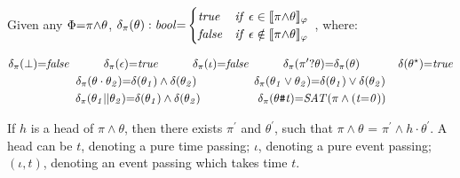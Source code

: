 \documentclass[acmsmall,10pt,review]{acmart}
\newcommand{\es}{\theta}
\newcommand{\ev}{\iota}
\newcommand{\effect}{\textcolor{black}{\ensuremath{\mathrm{\Phi}}}}
\newcommand{\seq}{\cdot}
\newcommand{\choice}{\vee}
\newcommand{\code}[1]{{\tt{\ensuremath{\m{#1}}}}}
\newcommand{\empt}{\textcolor{black}{\ensuremath{\epsilon}}}
\newcommand{\bott}{\textcolor{black}{\ensuremath{\bot}}}
\newcommand{\m}{\mathit}
\newcommand{\mysharp}{{\mathrel{\texttt{\#}}}}
\begin{document}
{\begin{definition}[Nullable]\label{Nullable}
Given any \code{\effect {=} \pi {\wedge} \es}, %
{
  \code{\delta_{{\pi}}(\es) :bool {=}
  \begin{cases}
        \code{true} & \code{if\ \empt \in \llbracket {\pi} {\wedge} \es \rrbracket_{\varphi}}\\
        \code{false} & \code{if\ \empt \notin \llbracket {\pi} {\wedge} \es \rrbracket_{\varphi}}
      \end{cases} }
      }, where:  

{ 
\begin{gather*}
\code{\delta_{\pi}(\bott) {=} false} 
\qquad\quad
\code{\delta_{\pi}(\empt) {=} true} 
\qquad\quad
\code{\delta_{\pi}(\ev){=} false}   
\qquad\quad
\code{\delta_{\pi}(\pi^\prime? \es){=} \delta_{\pi}(\es)}   
\qquad\quad\
    \code{\delta({\es^\star} ) {=} true}   
\\ 
\code{\delta_{\pi}(\es \seq \es_2) {=} \delta(\es_1) \wedge \delta(\es_2)}
\qquad\qquad\quad
  \code{\delta_{\pi}(\es_1 \choice \es_2) {=} \delta(\es_1) \vee \delta(\es_2)}   
  \\
\code{\delta_{\pi}(\es_1 || \es_2) {=} \delta(\es_1) \wedge \delta(\es_2)}
\qquad\qquad\quad
 \code{\delta_{\pi}(\es \mysharp  t) {=} SAT ({\pi} \wedge (t {=} 0) )}
\end{gather*}}
\end{definition}




\begin{definition}[Heads]\label{Heads}
If \code{h} is a head of \code{\pi \wedge \es}, then there exists 
\code{\pi^\prime} and \code{\es^\prime}, 
such that \code{\pi \wedge \es} {=} \code{\pi^\prime \wedge h \cdot \es^\prime}. 
A head can be  $t$, denoting a pure time passing; 
  $\ev $, denoting a pure event passing; 
  $(\ev, t)$, denoting an event passing which takes time \code{t}. 
\end{definition}


}
\end{document}
